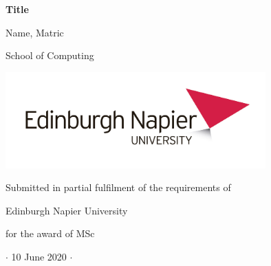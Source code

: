 


\thispagestyle{empty}


\begin{center}

\huge \textbf{Title}

\vspace{1.5cm}

{\Large Name, Matric}

\vspace{0.3cm}

{\large School of Computing}

\vspace{2cm}

\includegraphics[width=10cm]{ediburgh-napier-uni-logo-rgb.jpg}

\vspace{2cm}

{\Large Submitted in partial fulfilment of the requirements of}

{\Large Edinburgh Napier University}

{\Large for the award of MSc}


\vspace{1.5cm}

{\Large $\cdot$ 10 June 2020 $\cdot$}

\end{center}